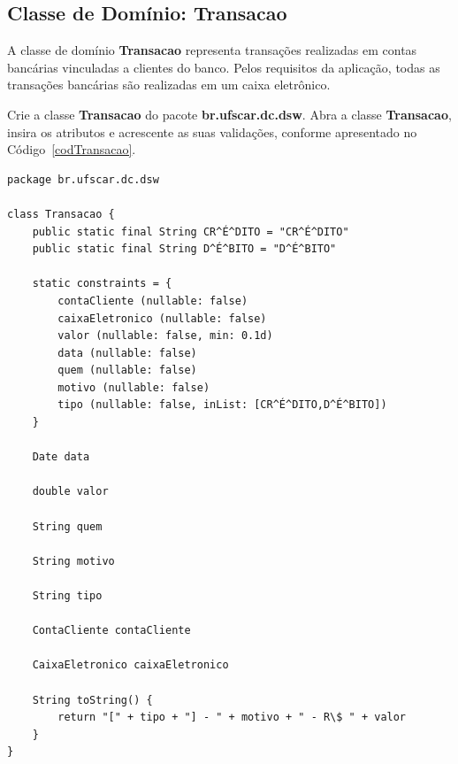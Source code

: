 \subsection{Classe de Domínio: Transacao}\label{secTransacao}

\vspace{0.3cm}

A classe de  domínio {\bf Transacao} representa transações  realizadas em contas
bancárias vinculadas a clientes do  banco.  Pelos requisitos da aplicação, todas
as transações bancárias são realizadas em um caixa eletrônico.

\vspace{0.2cm}

Crie a classe  {\bf Transacao} do pacote {\bf  br.ufscar.dc.dsw}.  Abra a classe
{\bf Transacao}, insira  os atributos e acrescente as  suas validações, conforme
apresentado no Código~\ref{codTransacao}.  

\begin{lstlisting}[caption=Classe  de  domínio {\bf  Transacao},  frame =  trBL,
    float=htbp, label=codTransacao] 
package br.ufscar.dc.dsw

class Transacao {
    public static final String CR^É^DITO = "CR^É^DITO"
    public static final String D^É^BITO = "D^É^BITO"
    
    static constraints = {
        contaCliente (nullable: false)
        caixaEletronico (nullable: false)
        valor (nullable: false, min: 0.1d)
        data (nullable: false)
        quem (nullable: false)
        motivo (nullable: false)
        tipo (nullable: false, inList: [CR^É^DITO,D^É^BITO])
    }
        
    Date data
    
    double valor
    
    String quem
    
    String motivo
    
    String tipo
    
    ContaCliente contaCliente
    
    CaixaEletronico caixaEletronico

    String toString() {
        return "[" + tipo + "] - " + motivo + " - R\$ " + valor 
    }
}
\end{lstlisting}

\hspace{1cm}\\

